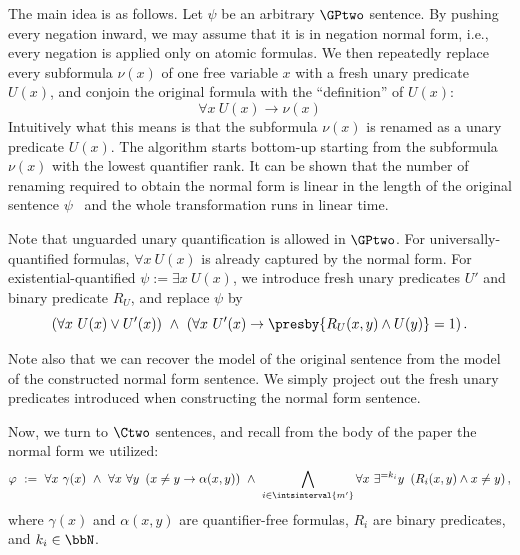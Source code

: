 The main idea is as follows.
Let $\psi$ be an arbitrary $\GPtwo$ sentence.
By pushing every negation inward, we may assume that it is in negation normal form,
i.e., every negation is applied only on atomic formulas.
We then repeatedly replace every subformula $\nu(x)$ of one free variable $x$ with a fresh unary predicate $U(x)$, and conjoin the original formula with the ``definition'' of $U(x)$:
$$
\forall x \ U(x) \to \nu(x)
$$
Intuitively what this means is that
the subformula $\nu(x)$ is renamed as a unary predicate $U(x)$.
The algorithm starts bottom-up starting from the subformula $\nu(x)$
with the lowest quantifier rank.
It can be shown that the number of renaming required to obtain the normal form is linear in the length of the original sentence $\psi$~\cite[Lemma 3.3]{twovarpres} and the whole transformation runs in linear time.

Note that unguarded unary quantification is allowed in $\GPtwo$.
For universally-quantified formulas, $\forall x\ U(x)$ is already captured by the normal form.
For existential-quantified $\psi := \exists x\ U(x)$,
we introduce fresh unary predicates $U'$ and binary predicate $R_U$, and replace $\psi$ by 
\begin{equation*}
    \left(
        \forall x\ U(x) \lor U'(x)
    \right)
    \ \land\ 
    \left(
        \forall x\ U'(x) \to \presby{R_U(x, y) \land U(y)} = 1
    \right).
\end{equation*}

Note also that we can recover the model of the original sentence from the model of the constructed normal form sentence.
We simply project out the fresh unary predicates introduced when constructing the normal form sentence. 

Now, we turn to $\Ctwo$ sentences, and recall from the body of the paper the normal form we utilized:
\begin{equation*}
    \varphi\ :=\ 
    \forall x\ \gamma(x)\ \land\ 
    \forall x\ \forall y\ \left(x \neq y \to \alpha(x, y)\right)\ \land\ 
    \bigwedge_{i \in \intsinterval{m'}} \forall x\ \exists^{=k_i} y\ \left(R_i(x,y) \land x \neq y\right),
\end{equation*}
where $\gamma(x)$ and $\alpha(x, y)$ are quantifier-free formulas,
$R_i$ are binary predicates,
and $k_i \in \bbN$.
 
